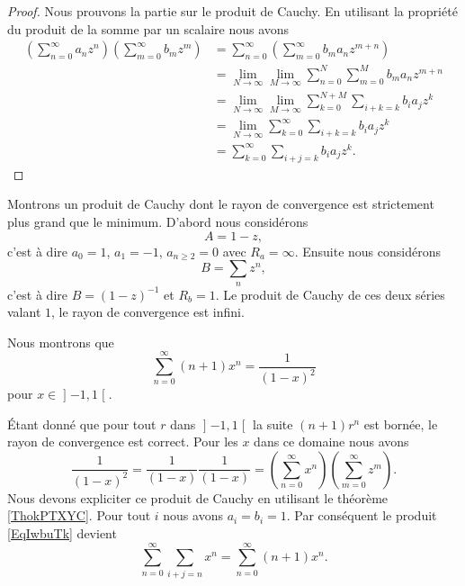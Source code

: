 \begin{proof}
    Nous prouvons la partie sur le produit de Cauchy. En utilisant la propriété du produit de la somme par un scalaire nous avons
    \begin{subequations}
        \begin{align}
            \left( \sum_{n=0}^{\infty}a_nz^n \right)\left( \sum_{m=0}^{\infty}b_mz^m \right)&=\sum_{n=0}^{\infty}\left( \sum_{m=0}^{\infty}b_ma_nz^{m+n} \right)\\
            &=\lim_{N\to \infty} \lim_{M\to \infty} \sum_{n=0}^N\sum_{m=0}^Mb_ma_nz^{m+n}\\
            &=\lim_{N\to \infty} \lim_{M\to \infty} \sum_{k=0}^{N+M}\sum_{i+k=k}b_ia_jz^k\\
            &=\lim_{N\to \infty} \sum_{k=0}^{\infty}\sum_{i+k=k}b_ia_jz^k\\
            &=\sum_{k=0}^{\infty}\sum_{i+j=k}b_ia_jz^k.
        \end{align}
    \end{subequations}
\end{proof}

\begin{example}
    Montrons un produit de Cauchy dont le rayon de convergence est strictement plus grand que le minimum. D'abord nous considérons
    \begin{equation}
        A=1-z,
    \end{equation}
    c'est à dire \( a_0=1\), \( a_1=-1\), \( a_{n\geq 2}=0\) avec \( R_a=\infty\). Ensuite nous considérons
    \begin{equation}
        B=\sum_nz^n,
    \end{equation}
    c'est à dire \( B=(1-z)^{-1}\) et \( R_b=1\). Le produit de Cauchy de ces deux séries valant \( 1\), le rayon de convergence est infini.
\end{example}

\begin{example}
    Nous montrons que
    \begin{equation}
        \sum_{n=0}^{\infty}(n+1)x^n=\frac{1}{ (1-x)^2 }
    \end{equation}
    pour \( x\in\mathopen] -1 , 1 \mathclose[\).

    Étant donné que pour tout \( r\) dans \( \mathopen] -1 , 1 \mathclose[\) la suite \( (n+1)r^n\) est bornée, le rayon de convergence est correct. Pour les \( x\) dans ce domaine nous avons
    \begin{equation}        \label{EqIwbuTk}
        \frac{1}{ (1-x)^2 }=\frac{1}{ (1-x) }\frac{1}{ (1-x) }=\left( \sum_{n=0}^{\infty}x^n \right)\left( \sum_{m=0}^{\infty}z^m \right).
    \end{equation}
    Nous devons expliciter ce produit de Cauchy en utilisant le théorème \ref{ThokPTXYC}. Pour tout \( i\) nous avons \( a_i=b_i=1\). Par conséquent le produit \eqref{EqIwbuTk} devient
    \begin{equation}
        \sum_{n=0}^{\infty}\sum_{i+j=n}x^n=\sum_{n=0}^{\infty}(n+1)x^n.
    \end{equation}
\end{example}

